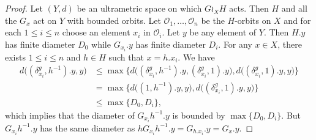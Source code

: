 \documentclass[a4paper]{article}
\theoremstyle{definition}
\begin{document}
\begin{proof}

Let $(Y,d)$ be an ultrametric space on which $G\wr_XH$ acts.
Then $H$ and all the $G_x$ act on $Y$ with bounded orbits.
Let $\mathcal O_1,\dots,\mathcal O_n$ be the $H$-orbits on $X$ and for each $1\leq i\leq n$ choose an element $x_i$ in $\mathcal O_i$.
Let $y$ be any element of $Y$.
Then $H.y$ has finite diameter $D_0$ while $G_{x_i}.y$ has finite diameter $D_i$.
For any $x\in X$, there exists $1\leq i\leq n$ and $h\in H$ such that $x=h.x_i$.
We have
\begin{align*}
	d\bigl((\delta_{x_i}^g,h^{-1}).y,y\bigr)&\leq\max\{d\bigl((\delta_{x_i}^g,h^{-1}).y,(\delta_{x_i}^g,1).y\bigr),d\bigl((\delta_{x_i}^g,1).y,y\bigr)\}\\
	&=\max\{d\bigl((1,h^{-1}).y,y\bigr),d\bigl((\delta_{x_i}^g,1).y,y\bigr)\}\\
	&\leq \max\{D_0,D_i\},
\end{align*}
which implies that the diameter of $G_{x_i}h^{-1}.y$ is bounded by $\max\{D_0,D_i\}$.
But $G_{x_i}h^{-1}.y$ has the same diameter as $hG_{x_i}h^{-1}.y=G_{h.x_i}.y=G_x.y$.


\end{proof}
\end{document}
